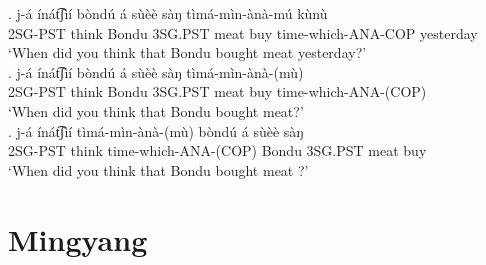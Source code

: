 \documentclass{assets/fieldnotes}
\begin{document}
\exg. j-á ínát͡ʃìí bòndú á sùèè sàŋ tìmá-mìn-ànà-mú kùnù\\
2SG-PST think Bondu 3SG.PST meat buy time-which-ANA-COP yesterday\\
`When did you think that Bondu bought meat yesterday?'  \\  

\exg. j-á ínát͡ʃìí bòndú á sùèè sàŋ tìmá-mìn-ànà-(mù)\\
2SG-PST think Bondu 3SG.PST meat buy time-which-ANA-(COP)\\
`When did you think that Bondu bought meat?'  \\  

\exg. j-á ínát͡ʃìí tìmá-mìn-ànà-(mù) bòndú á sùèè sàŋ\\
2SG-PST think time-which-ANA-(COP) Bondu 3SG.PST meat buy\\
`When did you think that Bondu bought meat ?'  \\  
 



\section{Mingyang}
\end{document}
